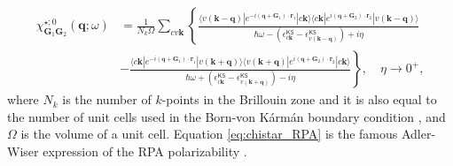 \documentclass[11pt, oneside]{article}          %
\begin{document}
\begin{equation}
  \label{eq:chistar_RPA}
  \begin{aligned}
    \chi^{\star;0}_{{\bm G}_1 {\bm G}_2} ({\bm q}; \omega) & = \frac{1}{N_k \Omega} \sum_{c v {\bm k}} \left \{ \frac{\langle v ({\bm k} - {\bm q}) | e^{-i ({\bm q} + {\bm G}_1) \cdot {\bm r}_1} | c {\bm k} \rangle \langle c {\bm k} | e^{i ({\bm q} + {\bm G}_2) \cdot {\bm r}_2} | v ({\bm k} - {\bm q}) \rangle}{\hbar \omega - (\epsilon^{\mathsf{KS}}_{c {\bm k}} - \epsilon^{\mathsf{KS}}_{v ({\bm k} - {\bm q})}) + i \eta} \right . \\
    & \left . - \frac{\langle c {\bm k} | e^{-i ({\bm q} + {\bm G}_1)\cdot {\bm r}_1} | v ({\bm k} + {\bm q}) \rangle \langle v ({\bm k} + {\bm q}) | e^{i({\bm q} + {\bm G}_2) \cdot {\bm r}_2} | c {\bm k} \rangle}{\hbar \omega + (\epsilon^{\mathsf{KS}}_{c {\bm k}} - \epsilon^{\mathsf{KS}}_{v ({\bm k} + {\bm q})}) - i \eta} \right \}, \quad \eta \rightarrow 0^{+},
  \end{aligned}
\end{equation}
where $N_k$ is the number of $k$-points in the Brillouin zone and it is also equal to the number of unit cells used in the Born-von K\'{a}rm\'{a}n boundary condition \cite{cohen2016fundamentals}, and $\Omega$ is the volume of a unit cell. Equation \eqref{eq:chistar_RPA} is the famous Adler-Wiser expression of the RPA polarizability \cite{adler1962quantum, wiser1963dielectric}.
\end{document}
